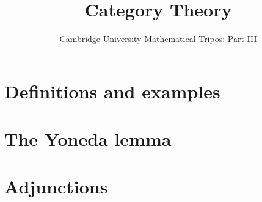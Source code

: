 \documentclass{article}
\title{Category Theory}
\author{Cambridge University Mathematical Tripos: Part III}
\begin{document}
\maketitle

\tableofcontentsnewpage{}

\section{Definitions and examples}

\section{The Yoneda lemma}

\section{Adjunctions}

\end{document}
